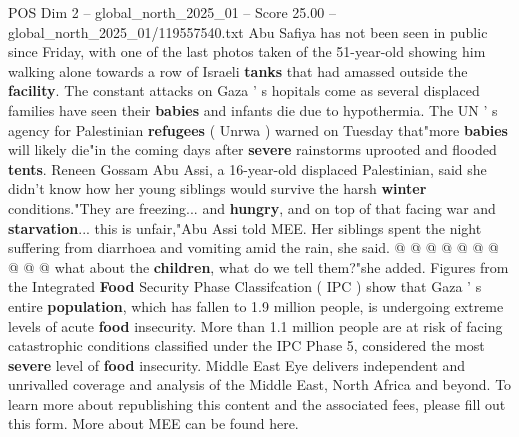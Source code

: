 \begin{textsample}{POS Dim 2 – global\_north\_2025\_01 – Score 25.00 – global\_north\_2025\_01/119557540.txt}
Abu Safiya has not been seen in public since Friday, with one of the last photos taken of the 51-year-old showing him walking alone towards a row of Israeli \textbf{tanks} that had amassed outside the \textbf{facility}.
The constant attacks on Gaza ' s hopitals come as several displaced families have seen their \textbf{babies} and infants die due to hypothermia.
The UN ' s agency for Palestinian \textbf{refugees} ( Unrwa ) warned on Tuesday that"more \textbf{babies} will likely die"in the coming days after \textbf{severe} rainstorms uprooted and flooded \textbf{tents}.
Reneen Gossam Abu Assi, a 16-year-old displaced Palestinian, said she didn't know how her young siblings would survive the harsh \textbf{winter} conditions."They are freezing... and \textbf{hungry}, and on top of that facing war and \textbf{starvation}... this is unfair,"Abu Assi told MEE.
Her siblings spent the night suffering from diarrhoea and vomiting amid the rain, she said. @ @ @ @ @ @ @ @ @ @ what about the \textbf{children}, what do we tell them?"she added.
Figures from the Integrated \textbf{Food} Security Phase Classifcation ( IPC ) show that Gaza ' s entire \textbf{population}, which has fallen to 1.9 million people, is undergoing extreme levels of acute \textbf{food} insecurity.
More than 1.1 million people are at risk of facing catastrophic conditions classified under the IPC Phase 5, considered the most \textbf{severe} level of \textbf{food} insecurity.
Middle East Eye delivers independent and unrivalled coverage and analysis of the Middle East, North Africa and beyond.
To learn more about republishing this content and the associated fees, please fill out this form.
More about MEE can be found here.

\end{textsample}
